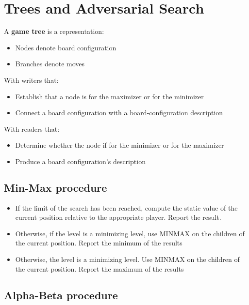 \documentclass{article}
\begin{document}
\section{Trees and Adversarial Search}

A \textbf{game tree} is a representation:
\begin{itemize}
  \item Nodes denote board configuration
  \item Branches denote moves
\end{itemize}
With writers that:
\begin{itemize}
  \item Establish that a node is for the maximizer or for
    the minimizer
  \item Connect a board configuration with a board-configuration
    description
\end{itemize}
With readers that:
\begin{itemize}
  \item Determine whether the node if for the minimizer
    or for the maximizer
  \item Produce a board configuration's description
\end{itemize}

\subsection{Min-Max procedure}

\begin{itemize}
  \item If the limit of the search has been reached, compute 
    the static value of the current position relative to the
    appropriate player. Report the result.
  \item Otherwise, if the level is a minimizing level, use
    MINMAX on the children of the current position. Report 
    the minimum of the results
  \item Otherwise, the level is a minimizing level. Use
    MINMAX on the children of the current position. Report 
    the maximum of the results
\end{itemize}

\subsection{Alpha-Beta procedure}
\end{document}
